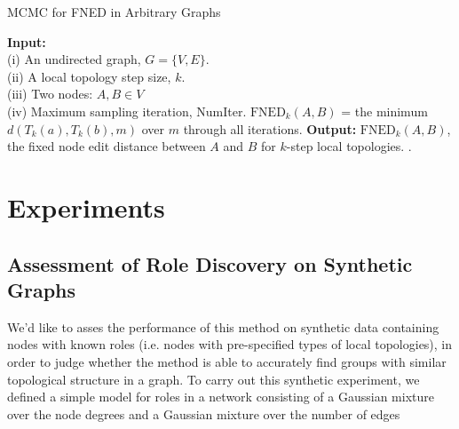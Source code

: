 \documentclass{article}
\begin{document}
\begin{algorithm}[h!tbp]
\caption{MCMC for FNED in Arbitrary Graphs}
\label{alg:fnedMcmc}
\begin{algorithmic}[1]
\STATE \textbf{Input:} \\(i) An undirected graph, $G = \{V,E\}$.\\(ii) A local topology step size, $k$.\\(iii) Two nodes: $A, B \in V$\\(iv) Maximum sampling iteration, NumIter.
\ELSE
{}
\ENDIF
\ENDIF
\ENDFOR
\STATE $\text{FNED}_{k}(A,B)$ = the minimum $d(T_{k}(a), T_{k}(b), m)$ over $m$ through all iterations.
\STATE \textbf{Output:} $\text{FNED}_{k}(A,B)$, the fixed node edit distance between $A$ and $B$ for $k$-step local topologies.
.
\end{algorithmic}
\end{algorithm}


\section{Experiments}
\label{sec:exp}



\subsection{Assessment of Role Discovery on Synthetic Graphs}
We'd like to asses the performance of this method on synthetic data containing nodes with known roles (i.e. nodes with pre-specified types of local topologies), in order to judge whether the method is able to accurately find groups with similar topological structure in a graph. To carry out this synthetic experiment, we defined a simple model for roles in a network consisting of a Gaussian mixture over the node degrees and a Gaussian mixture over the number of edges 
\end{document}

